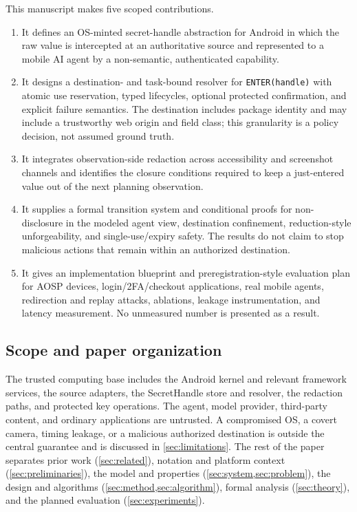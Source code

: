 This manuscript makes five scoped contributions.

\begin{enumerate}[leftmargin=*]
  \item It defines an OS-minted secret-handle abstraction for Android in which the raw value is intercepted at an authoritative source and represented to a mobile AI agent by a non-semantic, authenticated capability.
  \item It designs a destination- and task-bound resolver for \texttt{ENTER(handle)} with atomic use reservation, typed lifecycles, optional protected confirmation, and explicit failure semantics. The destination includes package identity and may include a trustworthy web origin and field class; this granularity is a policy decision, not assumed ground truth.
  \item It integrates observation-side redaction across accessibility and screenshot channels and identifies the closure conditions required to keep a just-entered value out of the next planning observation.
  \item It supplies a formal transition system and conditional proofs for non-disclosure in the modeled agent view, destination confinement, reduction-style unforgeability, and single-use/expiry safety. The results do not claim to stop malicious actions that remain within an authorized destination.
  \item It gives an implementation blueprint and preregistration-style evaluation plan for AOSP devices, login/2FA/checkout applications, real mobile agents, redirection and replay attacks, ablations, leakage instrumentation, and latency measurement. No unmeasured number is presented as a result.
\end{enumerate}

\subsection{Scope and paper organization}

The trusted computing base includes the Android kernel and relevant framework services, the source adapters, the SecretHandle store and resolver, the redaction paths, and protected key operations. The agent, model provider, third-party content, and ordinary applications are untrusted. A compromised OS, a covert camera, timing leakage, or a malicious authorized destination is outside the central guarantee and is discussed in \cref{sec:limitations}. The rest of the paper separates prior work (\cref{sec:related}), notation and platform context (\cref{sec:preliminaries}), the model and properties (\cref{sec:system,sec:problem}), the design and algorithms (\cref{sec:method,sec:algorithm}), formal analysis (\cref{sec:theory}), and the planned evaluation (\cref{sec:experiments}).
